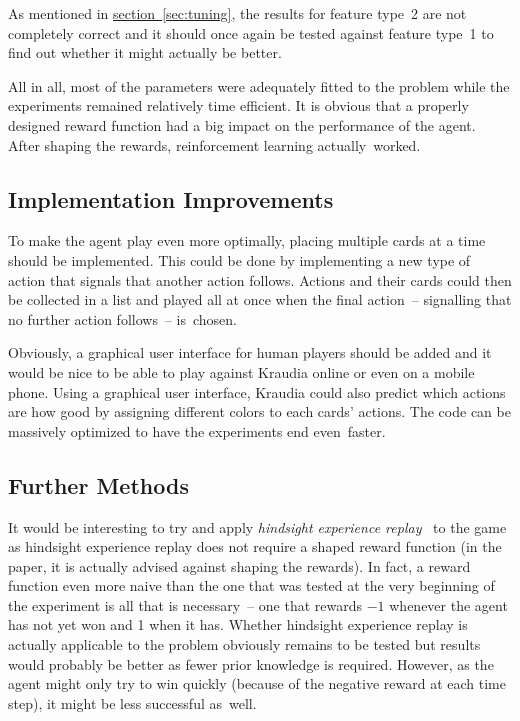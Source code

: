 \documentclass[a4paper,titlepage]{article}
\begin{document}
As mentioned in \hyperref[sec:tuning]{section~\ref*{sec:tuning}}, the results for feature type~2 are not completely correct and it should once again be tested against feature type~1 to find out whether it might actually be better.

All in all, most of the parameters were adequately fitted to the problem while the experiments remained relatively time efficient. It is obvious that a properly designed reward function had a big impact on the performance of the agent. After shaping the rewards, reinforcement learning actually~worked.

\subsection{Implementation Improvements}
\label{sec:improvements}

To make the agent play even more optimally, placing multiple cards at a time should be implemented. This could be done by implementing a new type of action that signals that another action follows. Actions and their cards could then be collected in a list and played all at once when the final action~-- signalling that no further action follows~-- is~chosen.

Obviously, a graphical user interface for human players should be added and it would be nice to be able to play against Kraudia online or even on a mobile phone. Using a graphical user interface, Kraudia could also predict which actions are how good by assigning different colors to each cards' actions. The code can be massively optimized to have the experiments end even~faster.

\subsection{Further Methods}

It would be interesting to try and apply \emph{hindsight experience replay}~\cite{her} to the game as hindsight experience replay does not require a shaped reward function (in the paper, it is actually advised against shaping the rewards). In fact, a reward function even more naive than the one that was tested at the very beginning of the experiment is all that is necessary~-- one that rewards $-1$ whenever the agent has not yet won and 1 when it has. Whether hindsight experience replay is actually applicable to the problem obviously remains to be tested but results would probably be better as fewer prior knowledge is required. However, as the agent might only try to win quickly (because of the negative reward at each time step), it might be less successful as~well.
\end{document}

